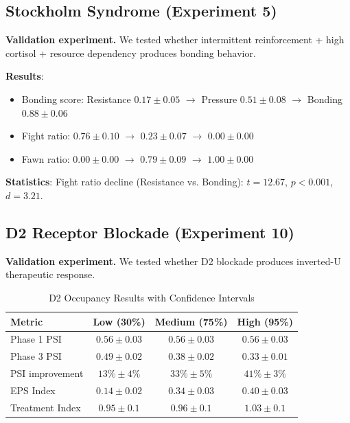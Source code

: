 \documentclass[10pt,a4paper]{article}
\begin{document}
\subsection{Stockholm Syndrome (Experiment 5)}

\textbf{Validation experiment.} We tested whether intermittent reinforcement + high cortisol + resource dependency produces bonding behavior.

\textbf{Results}:
\begin{itemize}
\item Bonding score: Resistance $0.17 \pm 0.05$ $\rightarrow$ Pressure $0.51 \pm 0.08$ $\rightarrow$ Bonding $0.88 \pm 0.06$
\item Fight ratio: $0.76 \pm 0.10$ $\rightarrow$ $0.23 \pm 0.07$ $\rightarrow$ $0.00 \pm 0.00$
\item Fawn ratio: $0.00 \pm 0.00$ $\rightarrow$ $0.79 \pm 0.09$ $\rightarrow$ $1.00 \pm 0.00$
\end{itemize}

\textbf{Statistics}: Fight ratio decline (Resistance vs. Bonding): $t=12.67$, $p<0.001$, $d=3.21$.

\subsection{D2 Receptor Blockade (Experiment 10)}

\textbf{Validation experiment.} We tested whether D2 blockade produces inverted-U therapeutic response.

\begin{table}[htbp]
\centering
\caption{D2 Occupancy Results with Confidence Intervals}
\label{tab:d2}
\begin{tabular}{lccc}
\toprule
\textbf{Metric} & \textbf{Low (30\%)} & \textbf{Medium (75\%)} & \textbf{High (95\%)} \\
\midrule
Phase 1 PSI & $0.56 \pm 0.03$ & $0.56 \pm 0.03$ & $0.56 \pm 0.03$ \\
Phase 3 PSI & $0.49 \pm 0.02$ & $0.38 \pm 0.02$ & $0.33 \pm 0.01$ \\
PSI improvement & $13\% \pm 4\%$ & $33\% \pm 5\%$ & $41\% \pm 3\%$ \\
EPS Index & $0.14 \pm 0.02$ & $0.34 \pm 0.03$ & $0.40 \pm 0.03$ \\
Treatment Index & $0.95 \pm 0.1$ & $\mathbf{0.96 \pm 0.1}$ & $1.03 \pm 0.1$ \\
\bottomrule
\end{tabular}
\end{table}
\end{document}
